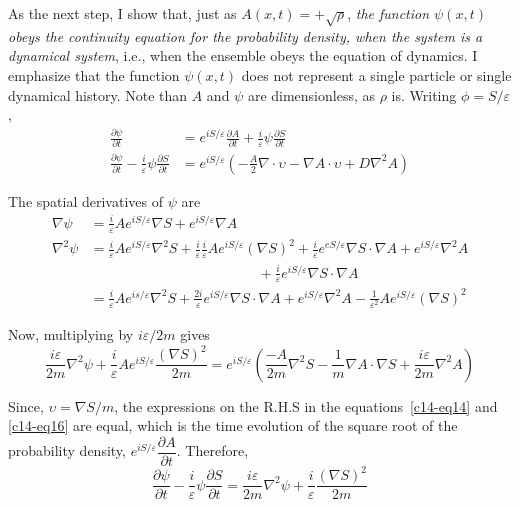 As the next step, I show that, just as $A(x, t) = + \sqrt{\rho}$, \textit{the function $\psi (x, t)$ obeys the
continuity equation for the probability density, when the system is a dynamical system}, i.e.,
when the ensemble obeys the equation of dynamics. I emphasize that the function $\psi(x, t)$
does not represent a single particle or single dynamical history. Note than $A$ and $\psi$ are
dimensionless, as $\rho$ is. Writing $\phi = S/\varepsilon$,
{\fontsize{9}{9}\selectfont\begin{align*}
\frac{\partial \psi}{\partial t} & = e^{i S/\varepsilon} \frac{\partial A}{\partial t} + \frac{i}{\varepsilon} \psi \frac{\partial S}{\partial t} \\
\frac{\partial \psi}{\partial t} - \frac{i}{\varepsilon} \psi \frac{\partial S}{\partial t} & = e^{i S  / \varepsilon} \left(- \frac{A}{2} \nabla \cdot \upsilon - \nabla A \cdot \upsilon + D \nabla^2 A \right) \tag{14}\label{c14-eq14}
\end{align*}}

The spatial derivatives of $\psi$ are
{\fontsize{9}{9}\selectfont\begin{align*}
\nabla \psi & = \frac{i}{\varepsilon} Ae^{iS/\varepsilon} \nabla S + e^{iS/\varepsilon} \nabla A\\
\nabla^2 \psi & = \frac{i}{\varepsilon} Ae^{iS/ \varepsilon} \nabla^2 S + \frac{i}{\varepsilon} \frac{i}{\varepsilon} Ae^{iS/ \varepsilon} (\nabla S)^2 + \frac{i}{\varepsilon} e^{eS/\varepsilon} \nabla S \cdot \nabla A + e^{i S /\varepsilon} \nabla^2 A\\ 
&\qquad\qquad\qquad\qquad\qquad\qquad+ \frac{i}{\varepsilon} e^{iS/\varepsilon } \nabla S \cdot \nabla A \\
& = \frac{i}{\varepsilon} Ae^{is/\varepsilon} \nabla^2 S + \frac{2i}{\varepsilon} e^{iS/\varepsilon} \nabla S \cdot \nabla A + e^{i S/\varepsilon} \nabla^2 A - \frac{1}{\varepsilon^2} A e^{iS/\varepsilon} (\nabla S)^2 \tag{15}\label{c14-eq15}
\end{align*}}

Now, multiplying by $i\varepsilon /2m$ gives
\begin{equation*}
\frac{i\varepsilon}{2m} \nabla^2 \psi + \frac{i}{\varepsilon} A e^{iS/\varepsilon} \frac{(\nabla S)^2}{2m} = e^{iS/\varepsilon} \left(\frac{-A}{2m} \nabla^2 S - \frac{1}{m} \nabla A \cdot \nabla S + \frac{i\varepsilon}{2m} \nabla^2 A \right) \tag{16}\label{c14-eq16}
\end{equation*}

Since, $\upsilon = \nabla S/m$, the expressions on the R.H.S in the equations~\ref{c14-eq14} and \ref{c14-eq16} are equal,
which is the time evolution of the square root of the probability density, $e^{iS/ \varepsilon} \dfrac{\partial A}{\partial t}$. Therefore,
\begin{equation*}
\frac{\partial \psi}{\partial t} - \frac{i}{\varepsilon} \psi \frac{\partial S}{\partial t} = \frac{i\varepsilon}{2m} \nabla^2 \psi + \frac{i}{\varepsilon} \frac{(\nabla S)^2}{2m} \tag{17}\label{c14-eq17}
\end{equation*}

